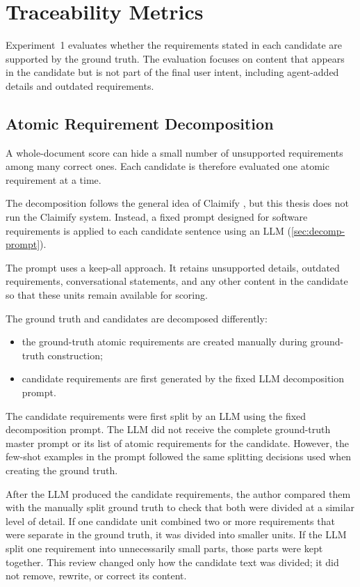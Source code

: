 \section{Traceability Metrics}
\label{sec:method-metrics}

Experiment~1 evaluates whether the requirements stated in each candidate are
supported by the ground truth. The evaluation focuses on content that appears
in the candidate but is not part of the final user intent, including
agent-added details and outdated requirements.

\subsection{Atomic Requirement Decomposition}

A whole-document score can hide a small number of unsupported requirements
among many correct ones. Each candidate is therefore evaluated one atomic
requirement at a time.

The decomposition follows the general idea of Claimify
\citep{metropolitansky2025claimify}, but this thesis does not run the Claimify
system. Instead, a fixed prompt designed for software requirements is applied
to each candidate sentence using an LLM
(\cref{sec:decomp-prompt}).

The prompt uses a keep-all approach. It retains unsupported details,
outdated requirements, conversational statements, and any other content in
the candidate so that these units remain available for scoring.

The ground truth and candidates are decomposed differently:

\begin{itemize}[leftmargin=*]
  \item the ground-truth atomic requirements are created manually during
  ground-truth construction;
  \item candidate requirements are first generated by the fixed LLM
  decomposition prompt.
\end{itemize}

The candidate requirements were first split by an LLM using the fixed
decomposition prompt. The LLM did not receive the complete ground-truth master
prompt or its list of atomic requirements for the candidate.
However, the few-shot examples in the prompt followed the same splitting
decisions used when creating the ground truth.

After the LLM produced the candidate requirements, the author compared them
with the manually split ground truth to check that both were divided at a
similar level of detail. If one candidate unit combined two or more requirements 
that were separate in the ground truth, it was divided into smaller units. 
If the LLM split one requirement into unnecessarily small parts, those parts were kept
together. This review changed only how the candidate text was divided; it did
not remove, rewrite, or correct its content.

